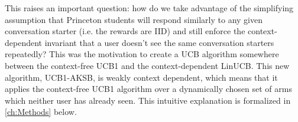 This raises an important question: how do we take advantage of the simplifying assumption that Princeton students will respond similarly to any given conversation starter (i.e. the rewards are IID) and still enforce the context-dependent invariant that a user doesn't see the same conversation starters repeatedly? This was the motivation to create a UCB algorithm somewhere between the context-free UCB1 and the context-dependent LinUCB. This new algorithm, UCB1-AKSB, is weakly context dependent, which means that it applies the context-free UCB1 algorithm over a dynamically chosen set of arms which neither user has already seen. This intuitive explanation is formalized in \autoref{ch:Methods} below.
